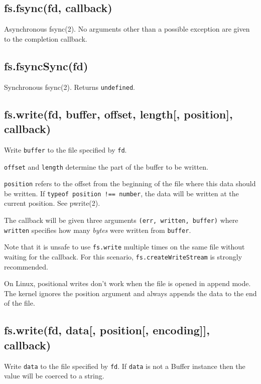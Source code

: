 \subsection{fs.fsync(fd, callback)}\label{fs.fsyncfd-callback}

Asynchronous fsync(2). No arguments other than a possible exception are
given to the completion callback.

\subsection{fs.fsyncSync(fd)}\label{fs.fsyncsyncfd}

Synchronous fsync(2). Returns \texttt{undefined}.

\subsection{fs.write(fd, buffer, offset, length{[}, position{]},
callback)}\label{fs.writefd-buffer-offset-length-position-callback}

Write \texttt{buffer} to the file specified by \texttt{fd}.

\texttt{offset} and \texttt{length} determine the part of the buffer to
be written.

\texttt{position} refers to the offset from the beginning of the file
where this data should be written. If
\texttt{typeof\ position\ !==\ \textquotesingle{}number\textquotesingle{}},
the data will be written at the current position. See pwrite(2).

The callback will be given three arguments
\texttt{(err,\ written,\ buffer)} where \texttt{written} specifies how
many \emph{bytes} were written from \texttt{buffer}.

Note that it is unsafe to use \texttt{fs.write} multiple times on the
same file without waiting for the callback. For this scenario,
\texttt{fs.createWriteStream} is strongly recommended.

On Linux, positional writes don't work when the file is opened in append
mode. The kernel ignores the position argument and always appends the
data to the end of the file.

\subsection{fs.write(fd, data{[}, position{[}, encoding{]}{]},
callback)}\label{fs.writefd-data-position-encoding-callback}

Write \texttt{data} to the file specified by \texttt{fd}. If
\texttt{data} is not a Buffer instance then the value will be coerced to
a string.

